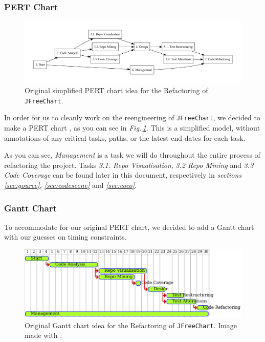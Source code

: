 \documentclass[11pt]{article}
\begin{document}
	\subsubsection{PERT Chart} 
	\begin{figure}[H] 
		\centering 
		\includegraphics[width=\textwidth]{pictures/pert-original.pdf}
		\caption{Original simplified \textsf{PERT} chart idea for the Refactoring of \texttt{JFreeChart}.} 
		\label{fig:pert-orig} 
	\end{figure} 
   
	In order for us to cleanly work on the reengineering of \texttt{JFreeChart}, we decided to make a \textsf{PERT} chart \cite{pert}, as you can see in \textsl{Fig.\,\ref{fig:pert-orig}}. This is a simplified model, without annotations of any critical tasks, paths, or the latest end dates for each task. 
   
	As you can see, \textsl{Management} is a task we will do throughout the entire process of refactoring the project. Tasks \textsl{3.1. Repo Visualisation}, \textsl{3.2 Repo Mining} and \textsl{3.3 Code Coverage} can be found later in this document, respectively in \textsl{sections \ref{sec:gource}, \ref{sec:codescene}} and \textsl{\ref{sec:coco}}.
	
	\subsubsection{Gantt Chart}
	To accommodate for our original \textsf{PERT} chart, we decided to add a \textsf{Gantt} chart \cite{gantt} with our guesses on timing constraints.
	
	\begin{figure}[H] 
		\centering 
		\includegraphics[width=\textwidth]{pictures/gantt-original.pdf}
		\caption{Original \textsf{Gantt} chart idea for the Refactoring of \texttt{JFreeChart}. Image made with \cite{plantuml}.} 
		\label{fig:gantt-orig} 
	\end{figure} 
\end{document}
